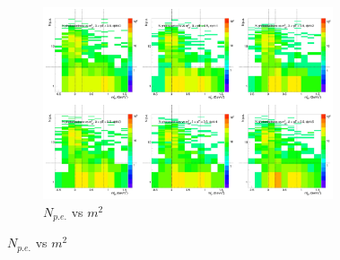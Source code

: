 \begin{figure}[H]
  \centering
    \begin{subfigure}{1\textwidth}
   \centering
   \includegraphics[width=0.94\textwidth]{hiptfits/neg/PSaccthreshold_cent0_ich0_accfire0_ptbin12.jpg}
    \caption{$N_{p.e.}$ vs $m^2$}
    \end{subfigure}
\end{figure}
